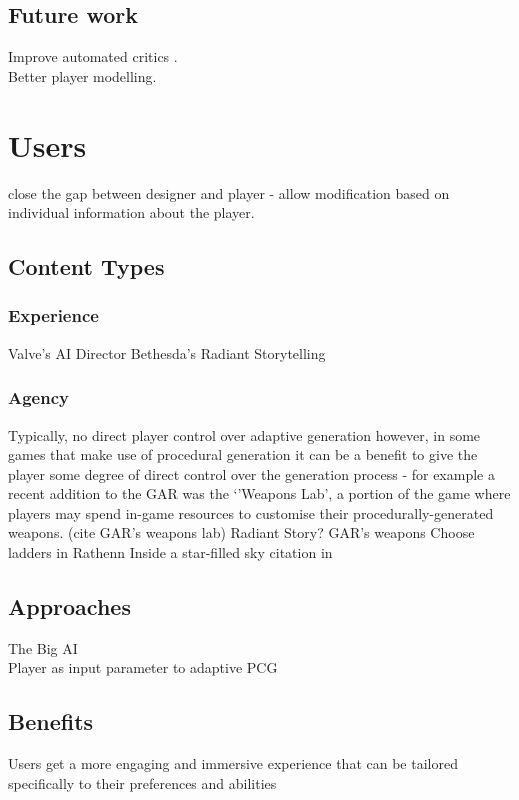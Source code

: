 \documentclass{acm_proc_article-sp}
\begin{document}
\subsection{Future work}
Improve automated critics \cite{hendrikx2012procedural}.\\
Better player modelling.

\newpage
\section{Users}
close the gap between designer and player - allow modification based on individual information about the player.

\cite{sorenson2010towards}
\subsection{Content Types}
\subsubsection{Experience}
Valve's AI Director \cite{valve}
Bethesda's Radiant Storytelling \cite{radiant}
\subsubsection{Agency}
Typically, no direct player control over adaptive generation \cite{hamlet}
however, in some games that make use of procedural generation it can be a benefit to give the player some degree of direct control over the generation process - for example a recent addition to the GAR was the `'Weapons Lab', a portion of the game where players may spend in-game resources to customise their procedurally-generated weapons. (cite GAR's weapons lab)
Radiant Story?
GAR's weapons
Choose ladders in Rathenn \cite{smith2011pcg}
Inside a star-filled sky citation in \cite{smith2011pcg}

\subsection{Approaches}
The Big AI\\
Player as input parameter to adaptive PCG
\subsection{Benefits}
Users get a more engaging and immersive experience that can be tailored specifically to their preferences and abilities
\end{document}
